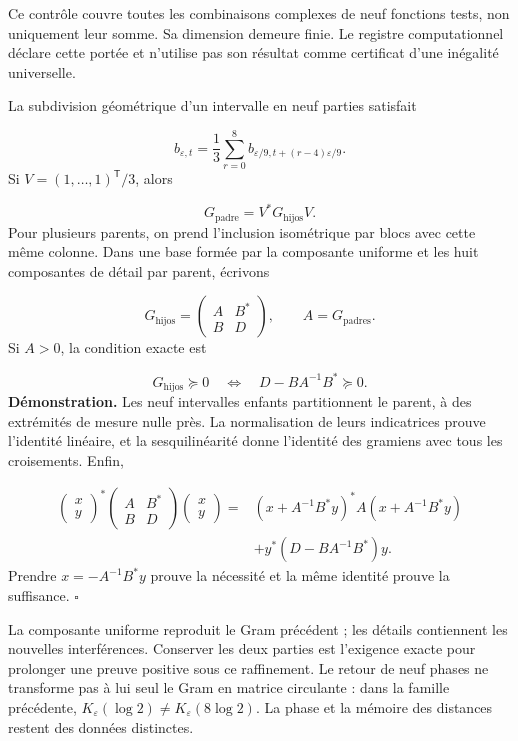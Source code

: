 Ce contrôle couvre toutes les combinaisons complexes de neuf fonctions tests, non uniquement leur somme. Sa dimension demeure finie. Le registre computationnel déclare cette portée et n’utilise pas son résultat comme certificat d’une inégalité universelle.

La subdivision géométrique d’un intervalle en neuf parties satisfait

\[
b_{\varepsilon,t}=\frac13\sum_{r=0}^8
b_{\varepsilon/9,t+(r-4)\varepsilon/9}.
\]
Si \(V=(1,\ldots,1)^{\mathsf T}/3\), alors

\[
G_{\mathrm{padre}}=V^*G_{\mathrm{hijos}}V.
\]
Pour plusieurs parents, on prend l'inclusion isométrique par blocs avec cette même colonne. Dans une base formée par la composante uniforme et les huit composantes de détail par parent, écrivons

\[
G_{\mathrm{hijos}}=
\begin{pmatrix}A&B^*\\B&D\end{pmatrix},\qquad
A=G_{\mathrm{padres}}.
\]
Si \(A>0\), la condition exacte est

\[
G_{\mathrm{hijos}}\succeq0
\quad\Longleftrightarrow\quad D-BA^{-1}B^*\succeq0.
\]
\textbf{Démonstration.} Les neuf intervalles enfants partitionnent le parent, à des extrémités de mesure nulle près. La normalisation de leurs indicatrices prouve l’identité linéaire, et la sesquilinéarité donne l’identité des gramiens avec tous les croisements. Enfin,

\[
\begin{aligned}
\begin{pmatrix}x\\y\end{pmatrix}^*
\begin{pmatrix}A&B^*\\B&D\end{pmatrix}
\begin{pmatrix}x\\y\end{pmatrix}
={}&(x+A^{-1}B^*y)^*A(x+A^{-1}B^*y)\\
&+y^*(D-BA^{-1}B^*)y.
\end{aligned}
\]
Prendre \(x=-A^{-1}B^*y\) prouve la nécessité et la même identité prouve la suffisance. \hfill\(\square\)

La composante uniforme reproduit le Gram précédent ; les détails contiennent les nouvelles interférences. Conserver les deux parties est l’exigence exacte pour prolonger une preuve positive sous ce raffinement. Le retour de neuf phases ne transforme pas à lui seul le Gram en matrice circulante : dans la famille précédente, \(K_\varepsilon(\log2)\neq K_\varepsilon(8\log2)\). La phase et la mémoire des distances restent des données distinctes.

